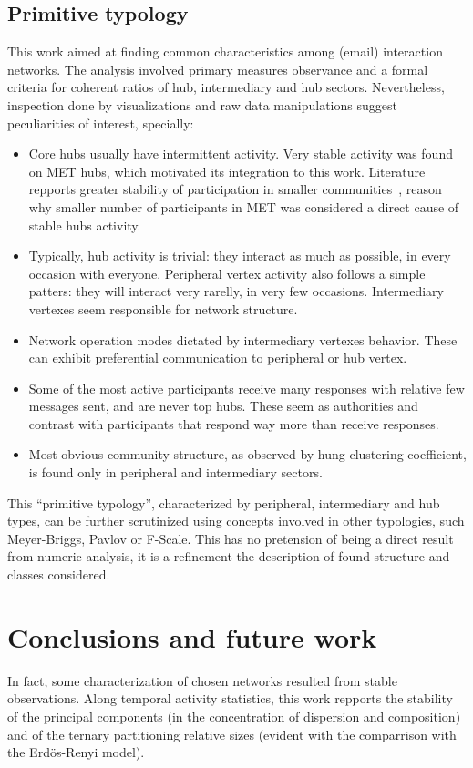 \documentclass[%
 aip,
 jmp,%
 amsmath,amssymb,
 reprint,%
]{revtex4-1}
\begin{document}
    \subsection{Primitive typology}

This work aimed at finding common characteristics among (email) interaction networks. The analysis  involved primary measures observance and a formal criteria for coherent ratios of hub, intermediary and hub sectors. Nevertheless, inspection done by visualizations and raw data manipulations suggest peculiarities of interest, specially:

\begin{itemize}
    \item Core hubs usually have intermittent activity. Very stable activity was found on MET hubs, which motivated its integration to this work. Literature repports greater stability of participation in smaller communities~\cite{barabasiEvo}, reason why smaller number of participants in MET was considered a direct cause of stable hubs activity.
    \item Typically, hub activity is trivial: they interact as much as possible, in every occasion with everyone. Peripheral vertex activity also follows a simple patters: they will interact very rarelly, in very few occasions. Intermediary vertexes seem responsible for network structure.
    \item Network operation modes dictated by intermediary vertexes behavior. These can exhibit preferential communication to peripheral or hub vertex.
    \item Some of the most active participants receive many responses with relative few messages sent, and are never top hubs. These seem as authorities and contrast with participants that respond way more than receive responses.
    \item Most obvious community structure, as observed by hung clustering coefficient, is found only in peripheral and intermediary sectors.
\end{itemize}

This ``primitive typology'', characterized by peripheral, intermediary and hub types, can be further scrutinized using concepts involved in other typologies, such Meyer-Briggs, Pavlov or F-Scale. This has no pretension of being a direct result from numeric analysis, it is a refinement the description of found structure and classes considered.

\section{Conclusions and future work}
In fact, some characterization of chosen networks resulted from stable observations. Along temporal activity statistics, this work repports the stability of the principal components (in the concentration of dispersion and composition) and of the ternary partitioning relative sizes (evident with the comparrison with the Erd\"os-Renyi model).
\end{document}

